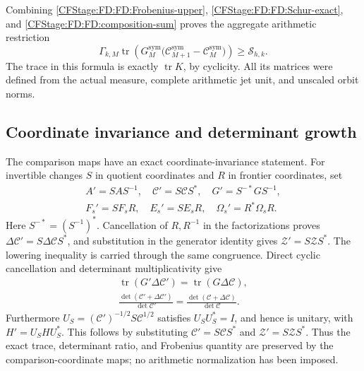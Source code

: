Combining \eqref{CFStage:FD:FD:Frobenius-upper}, \eqref{CFStage:FD:FD:Schur-exact}, and
\eqref{CFStage:FD:FD:composition-sum} proves the aggregate arithmetic restriction
\begin{equation}
\boxed{\Gamma_{k,M}\operatorname{tr}\!\left(
G_M^{\mathrm{sym}}\bigl(\mathcal C_{M+1}^{\mathrm{sym}}
-\mathcal C_M^{\mathrm{sym}}\bigr)\right)\ge\mathcal S_{h,k}.}
\tag{FD.34}\label{CFStage:FD:FD:aggregate-bound}
\end{equation}
The trace in this formula is exactly \(\operatorname{tr}K\), by
cyclicity.  All its matrices were defined from the actual measure,
complete arithmetic jet unit, and unscaled orbit norms.

\subsection{Coordinate invariance and determinant growth}

The comparison maps have an exact coordinate-invariance statement.
For invertible changes \(S\) in quotient coordinates and \(R\) in
frontier coordinates, set
\begin{equation}
\begin{gathered}
A'=SAS^{-1},\quad \mathcal C'=S\mathcal CS^*,\quad
G'=S^{-*}GS^{-1},\\
F_s'=SF_sR,\quad E_s'=SE_sR,\quad
\Omega_s'=R^*\Omega_sR.
\end{gathered}
\tag{FD.35}\label{CFStage:FD:FD:coordinate-change}
\end{equation}
Here \(S^{-*}=(S^{-1})^*\).  Cancellation of \(R,R^{-1}\) in the
factorizations proves \(\Delta\mathcal C'=S\Delta\mathcal CS^*\),
and substitution in the generator identity gives
\(\mathcal Z'=S\mathcal ZS^*\).  The lowering inequality is carried
through the same congruence.  Direct cyclic cancellation and determinant
multiplicativity give
\begin{equation}
\begin{gathered}
\operatorname{tr}(G'\Delta\mathcal C')
=\operatorname{tr}(G\Delta\mathcal C),\\
\frac{\det(\mathcal C'+\Delta\mathcal C')}{\det\mathcal C'}
=\frac{\det(\mathcal C+\Delta\mathcal C)}{\det\mathcal C}.
\end{gathered}
\tag{FD.36}\label{CFStage:FD:FD:coordinate-invariants}
\end{equation}
Furthermore
\(U_S=(\mathcal C')^{-1/2}S\mathcal C^{1/2}\) satisfies
\(U_SU_S^*=I\), and hence is unitary, with
\(H'=U_SHU_S^*\).  This follows by substituting
\(\mathcal C'=S\mathcal CS^*\) and
\(\mathcal Z'=S\mathcal ZS^*\).
Thus the exact trace, determinant ratio, and Frobenius quantity are
preserved by the comparison-coordinate maps; no arithmetic
normalization has been imposed.

